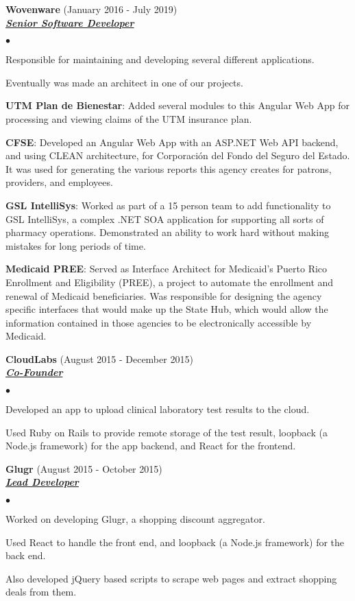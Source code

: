 \documentclass{article}
\newcommand{\employer}[3]{{ \textbf{#1} (#2)\\ \underline{\textbf{\emph{#3}}}\\  }}
\newenvironment{achievements}{\begin{list}{$\bullet$}{\topsep 0pt \itemsep -2pt}}{\vspace*{4pt}\end{list}}
\begin{document}
\employer{Wovenware}{January 2016 - July 2019}{Senior Software Developer}
	\begin{achievements}
	\item Responsible for maintaining and developing several different applications.
	\item Eventually was made an architect in one of our projects.
	\item \textbf{UTM Plan de Bienestar}: Added several modules to this Angular Web App for processing and viewing claims of the UTM insurance plan.
	\item \textbf{CFSE}: Developed an Angular Web App with an ASP.NET Web API backend, and using CLEAN architecture, for Corporaci\'on del Fondo del Seguro del Estado. It was used for generating the various reports this agency creates for patrons, providers, and employees.
	\item \textbf{GSL IntelliSys}: Worked as part of a 15 person team to add functionality to GSL IntelliSys, a complex .NET SOA application for supporting all sorts of pharmacy operations. Demonstrated an ability to work hard without making mistakes for long periods of time.
	\item \textbf{Medicaid PREE}: Served as Interface Architect for Medicaid's Puerto Rico Enrollment and Eligibility (PREE), a project to automate the enrollment and renewal of Medicaid beneficiaries. Was responsible for designing the agency specific interfaces that would make up the State Hub, which would allow the information contained in those agencies to be electronically accessible by Medicaid. 
	\end{achievements}

\employer{CloudLabs}{August 2015 - December 2015}{Co-Founder}
	\begin{achievements}
	\item Developed an app to upload clinical laboratory test results to the cloud.
	\item Used Ruby on Rails to provide remote storage of the test result, loopback (a Node.js framework) for the app backend, and React for the frontend.
	\end{achievements}

\employer{Glugr}{August 2015 - October 2015}{Lead Developer}
	\begin{achievements}
	\item Worked on developing Glugr, a shopping discount aggregator.
	\item Used React to handle the front end, and loopback (a Node.js framework) for the back end.
	\item Also developed jQuery based scripts to scrape web pages and extract shopping deals from them. 
	\end{achievements}
\end{document}

